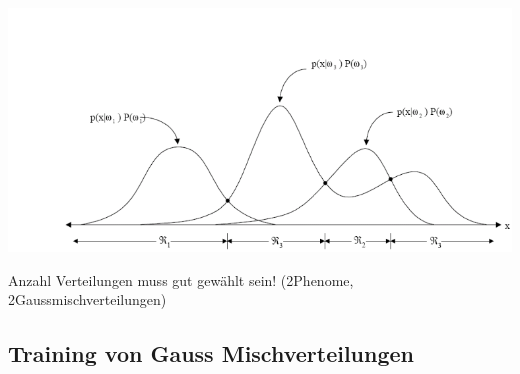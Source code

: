 \documentclass[a4paper,10pt,oneside]{article}
\begin{document}
\includegraphics[scale=0.65]{Grafiken/entscheidungsregionenmisch.png}

Anzahl Verteilungen muss gut gewählt sein! (2Phenome, 2Gaussmischverteilungen)

\subsection{Training von Gauss Mischverteilungen}
\end{document}
